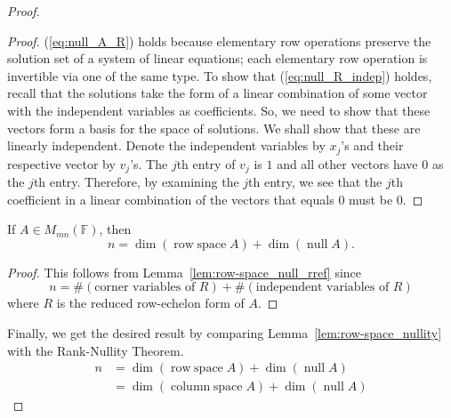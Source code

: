 \documentclass{article}
\begin{document}
\begin{proof}
\begin{proof}
		(\ref{eq:null_A_R}) holds because elementary row operations preserve the
		solution set of a system of linear equations; each elementary row operation
		is invertible via one of the same type.  To show that
		(\ref{eq:null_R_indep}) holdes, recall that the solutions take the form of
		a linear combination of some vector with the independent variables as
		coefficients.  So, we need to show that these vectors form a basis for the
		space of solutions.  We shall show that these are linearly independent.
		Denote the independent variables by \(x_j\)'s and their respective vector
		by \(v_j\)'s.  The \(j\)th entry of \(v_j\) is \(1\) and all other vectors
		have \(0\) as the \(j\)th entry.  Therefore, by examining the \(j\)th
		entry, we see that the \(j\)th coefficient in a linear combination of the
		vectors that equals \(0\) must be \(0\).
	\end{proof}
	\begin{lemma}\label{lem:row-space_nullity}
		If \(A\in M_{mn}(\mathbb{F})\), then
		\[
			n = \dim (\operatorname{row\;space} A) + \dim (\operatorname{null} A)
			.\]
	\end{lemma}
	\begin{proof}
		This follows from Lemma~\ref{lem:row-space_null_rref} since
		\[
			n = \# (\text{corner variables of } R) + \# (\text{independent variables of } R)
		\]
		where \(R\) is the reduced row-echelon form of \(A\).
	\end{proof}
	Finally, we get the desired result by comparing
	Lemma~\ref{lem:row-space_nullity} with the Rank-Nullity Theorem.
	\begin{align*}
		n & = \dim (\operatorname{row\;space} A) + \dim (\operatorname{null} A)    \\
		  & = \dim (\operatorname{column\;space} A) + \dim (\operatorname{null} A)
	\end{align*}
\end{proof}
\end{document}
